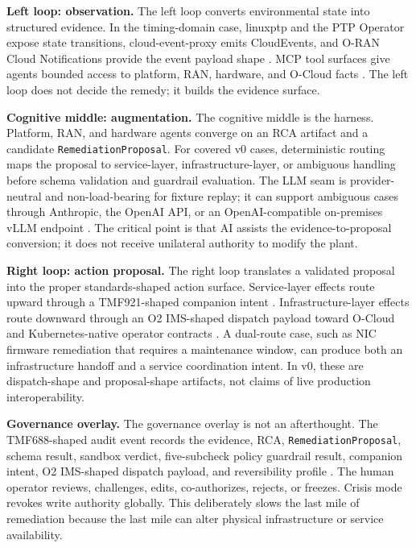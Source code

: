 \documentclass[twocolumn,10pt,a4paper]{article}
\begin{document}
\textbf{Left loop: observation.} The left loop converts environmental state into structured evidence. In the timing-domain case, linuxptp and the PTP Operator expose state transitions, cloud-event-proxy emits CloudEvents, and O-RAN Cloud Notifications provide the event payload shape \cite{linuxptp_ptp4l,cloud_event_proxy,cncf_cloudevents,oran_cloud_notifications}. MCP tool surfaces give agents bounded access to platform, RAN, hardware, and O-Cloud facts \cite{mcp_spec,mcp_python_sdk,fastmcp}. The left loop does not decide the remedy; it builds the evidence surface.

\textbf{Cognitive middle: augmentation.} The cognitive middle is the harness. Platform, RAN, and hardware agents converge on an RCA artifact and a candidate \texttt{RemediationProposal}. For covered v0 cases, deterministic routing maps the proposal to service-layer, infrastructure-layer, or ambiguous handling before schema validation and guardrail evaluation. The LLM seam is provider-neutral and non-load-bearing for fixture replay; it can support ambiguous cases through Anthropic, the OpenAI API, or an OpenAI-compatible on-premises vLLM endpoint \cite{litellm}. The critical point is that AI assists the evidence-to-proposal conversion; it does not receive unilateral authority to modify the plant.

\textbf{Right loop: action proposal.} The right loop translates a validated proposal into the proper standards-shaped action surface. Service-layer effects route upward through a TMF921-shaped companion intent \cite{tmf921}. Infrastructure-layer effects route downward through an O2 IMS-shaped dispatch payload toward O-Cloud and Kubernetes-native operator contracts \cite{oran_o2_ims,openshift_mco,kmm_operator,metal3_bmo}. A dual-route case, such as NIC firmware remediation that requires a maintenance window, can produce both an infrastructure handoff and a service coordination intent. In v0, these are dispatch-shape and proposal-shape artifacts, not claims of live production interoperability.

\textbf{Governance overlay.} The governance overlay is not an afterthought. The TMF688-shaped audit event records the evidence, RCA, \texttt{RemediationProposal}, schema result, sandbox verdict, five-subcheck policy guardrail result, companion intent, O2 IMS-shaped dispatch payload, and reversibility profile \cite{tmf688}. The human operator reviews, challenges, edits, co-authorizes, rejects, or freezes. Crisis mode revokes write authority globally. This deliberately slows the last mile of remediation because the last mile can alter physical infrastructure or service availability.
\end{document}
